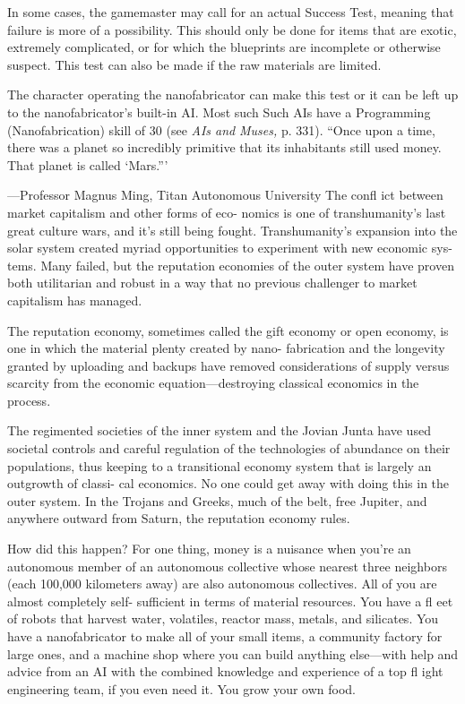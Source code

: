 In some cases, the gamemaster may call for an actual Success Test, 
meaning that failure is more of a possibility. This should only be 
done for items that are exotic, extremely complicated, or for which 
the blueprints are incomplete or otherwise suspect. This test can also 
be made if the raw materials are limited.

The character operating the nanofabricator can make this test or 
it can be left up to the nanofabricator's built-in AI. Most such Such 
AIs have a Programming (Nanofabrication) skill of 30 (see \textit{AIs and }
\textit{Muses,} p. 331).
``Once upon a time, there was a planet so incredibly primitive that its 
inhabitants still used money. That planet is called ‘Mars.'''

—Professor Magnus Ming, Titan Autonomous University
The confl ict between market capitalism and other forms of eco-
nomics is one of transhumanity's last great culture wars, and it's 
still being fought. Transhumanity's expansion into the solar system 
created myriad opportunities to experiment with new economic sys-
tems. Many failed, but the reputation economies of the outer system 
have proven both utilitarian and robust in a way that no previous 
challenger to market capitalism has managed.

The reputation economy, sometimes called the gift economy or 
open economy, is one in which the material plenty created by nano-
fabrication and the longevity granted by uploading and backups 
have removed considerations of supply versus scarcity from the 
economic equation—destroying classical economics in the process.

The regimented societies of the inner system and the Jovian 
Junta have used societal controls and careful regulation of the 
technologies of abundance on their populations, thus keeping to a 
transitional economy system that is largely an outgrowth of classi-
cal economics. No one could get away with doing this in the outer 
system. In the Trojans and Greeks, much of the belt, free Jupiter, and 
anywhere outward from Saturn, the reputation economy rules.

How did this happen? For one thing, money is a nuisance when 
you're an autonomous member of an autonomous collective whose 
nearest three neighbors (each 100,000 kilometers away) are also 
autonomous collectives. All of you are almost completely self-
sufficient in terms of material resources. You have a fl eet of robots 
that harvest water, volatiles, reactor mass, metals, and silicates. You 
have a nanofabricator to make all of your small items, a community 
factory for large ones, and a machine shop where you can build 
anything else—with help and advice from an AI with the combined 
knowledge and experience of a top fl ight engineering team, if you 
even need it. You grow your own food.

